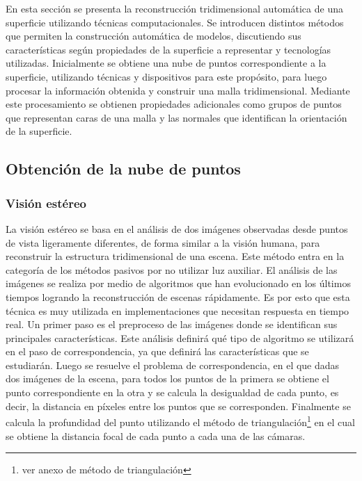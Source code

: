 En esta sección se presenta la reconstrucción tridimensional automática de una superficie utilizando técnicas computacionales.
Se introducen distintos métodos que permiten la construcción automática de modelos, discutiendo sus características según propiedades de la superficie a representar y tecnologías utilizadas. Inicialmente se obtiene una nube de puntos correspondiente a la superficie, utilizando técnicas y dispositivos para este propósito, para luego procesar la información obtenida y construir una malla tridimensional. Mediante este procesamiento se obtienen propiedades adicionales como grupos de puntos que representan caras de una malla y las normales que identifican la orientación de la superficie.

\subsection{Obtención de la nube de puntos}

\subsubsection{Visión estéreo}

La visión estéreo se basa en el análisis de dos imágenes observadas desde puntos de vista ligeramente diferentes, de forma similar a la visión humana, para reconstruir la estructura tridimensional de una escena. Este método entra en la categoría de los métodos pasivos por no utilizar luz auxiliar. El análisis de las imágenes se realiza por medio de algoritmos que han evolucionado en los últimos tiempos logrando la reconstrucción de escenas rápidamente. Es por esto que esta técnica es muy utilizada en implementaciones que necesitan respuesta en tiempo real.
Un primer paso es el preproceso de las imágenes donde se identifican sus principales características. Este análisis definirá qué tipo de algoritmo se utilizará en el paso de correspondencia, ya que definirá las características que se estudiarán. Luego se resuelve el problema de correspondencia, en el que dadas dos imágenes de la escena, para todos los puntos de la primera se obtiene el punto correspondiente en la otra y se calcula la desigualdad de cada punto, es decir, la distancia en píxeles entre los puntos que se corresponden. Finalmente se calcula la profundidad del punto utilizando el método de triangulación\footnote{ver anexo de método de triangulación} en el cual se obtiene la distancia focal de cada punto a cada una de las cámaras\cite{StereoReview}.


